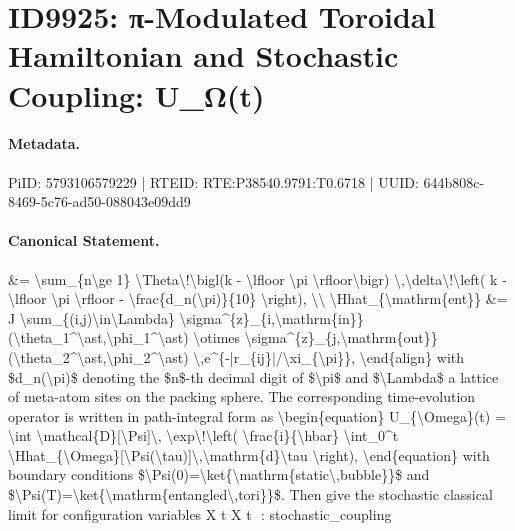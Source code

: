 \section*{ID9925: π-Modulated Toroidal Hamiltonian and Stochastic Coupling: U\_Ω(t)}
\paragraph{Metadata.}
PiID: 5793106579229 | RTEID: RTE:P38540.9791:T0.6718 | UUID: 644b808c-8469-5c76-ad50-088043e09dd9

\paragraph{Canonical Statement.}
\&= \textbackslash{}sum\_\{n\textbackslash{}ge 1\} \textbackslash{}Theta\textbackslash{}!\textbackslash{}bigl(k - \textbackslash{}lfloor \textbackslash{}pi \textbackslash{}rfloor\textbackslash{}bigr) \textbackslash{},\textbackslash{}delta\textbackslash{}!\textbackslash{}left( k - \textbackslash{}lfloor \textbackslash{}pi \textbackslash{}rfloor - \textbackslash{}frac\{d\_n(\textbackslash{}pi)\}\{10\} \textbackslash{}right), \textbackslash{}\textbackslash{} \textbackslash{}Hhat\_\{\textbackslash{}mathrm\{ent\}\} \&= J \textbackslash{}sum\_\{(i,j)\textbackslash{}in\textbackslash{}Lambda\} \textbackslash{}sigma\textasciicircum{}\{z\}\_\{i,\textbackslash{}mathrm\{in\}\}(\textbackslash{}theta\_1\textasciicircum{}\textbackslash{}ast,\textbackslash{}phi\_1\textasciicircum{}\textbackslash{}ast) \textbackslash{}otimes \textbackslash{}sigma\textasciicircum{}\{z\}\_\{j,\textbackslash{}mathrm\{out\}\}(\textbackslash{}theta\_2\textasciicircum{}\textbackslash{}ast,\textbackslash{}phi\_2\textasciicircum{}\textbackslash{}ast) \textbackslash{},e\textasciicircum{}\{-|r\_\{ij\}|/\textbackslash{}xi\_\{\textbackslash{}pi\}\}, \textbackslash{}end\{align\} with \$d\_n(\textbackslash{}pi)\$ denoting the \$n\$-th decimal digit of \$\textbackslash{}pi\$ and \$\textbackslash{}Lambda\$ a lattice of meta-atom sites on the packing sphere. The corresponding time-evolution operator is written in path-integral form as \textbackslash{}begin\{equation\} U\_\{\textbackslash{}Omega\}(t) = \textbackslash{}int \textbackslash{}mathcal\{D\}[\textbackslash{}Psi]\textbackslash{}, \textbackslash{}exp\textbackslash{}!\textbackslash{}left( \textbackslash{}frac\{i\}\{\textbackslash{}hbar\} \textbackslash{}int\_0\textasciicircum{}t \textbackslash{}Hhat\_\{\textbackslash{}Omega\}[\textbackslash{}Psi(\textbackslash{}tau)]\textbackslash{},\textbackslash{}mathrm\{d\}\textbackslash{}tau \textbackslash{}right), \textbackslash{}end\{equation\} with boundary conditions \$\textbackslash{}Psi(0)=\textbackslash{}ket\{\textbackslash{}mathrm\{static\textbackslash{},bubble\}\}\$ and \$\textbackslash{}Psi(T)=\textbackslash{}ket\{\textbackslash{}mathrm\{entangled\textbackslash{},tori\}\}\$. Then give the stochastic classical limit for configuration variables X t X t ​ : stochastic\_coupling

